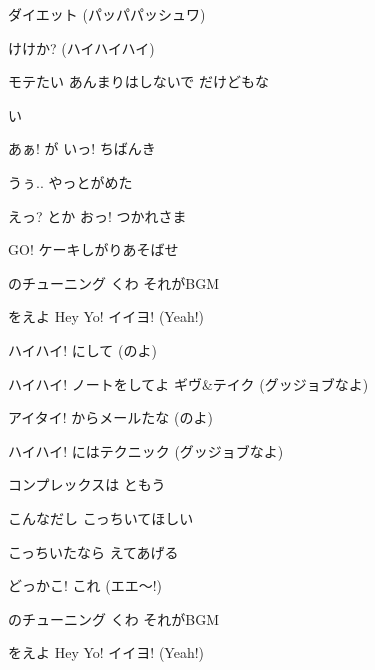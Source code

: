 \documentclass[14pt]{extreport}
\begin{document}
{  ダイエット (パッパパッシュワ)
  \jisho{}

  けけか? (ハイハイハイ)
  \jisho{}

  モテたい あんまりはしないで だけどもな
  \jisho{}

  い
  \jisho{}

\item
  あぁ! が いっ! ちばんき
  \jisho{}

  うぅ.. やっとがめた
  \jisho{}

  えっ? とか おっ! つかれさま
  \jisho{}

  GO! ケーキしがりあそばせ
  \jisho{}

\item
  のチューニング くわ それがBGM
  \jisho{}

    をえよ Hey Yo! イイヨ! (Yeah!)
  \jisho{}

\item
  ハイハイ!  にして (のよ)
  \jisho{}

  ハイハイ! ノートをしてよ ギヴ\&テイク (グッジョブなよ)
  \jisho{}

  アイタイ! からメールたな (のよ)
  \jisho{}

  ハイハイ! にはテクニック (グッジョブなよ)
  \jisho{}

\item
  コンプレックスは ともう
  \jisho{}

  こんなだし こっちいてほしい
  \jisho{}

  こっちいたなら えてあげる
  \jisho{}

  どっかこ! これ  (エエ～!)
  \jisho{}

\item
  のチューニング くわ それがBGM
  \jisho{}

    をえよ Hey Yo! イイヨ! (Yeah!)
  \jisho{}

}
\end{document}
